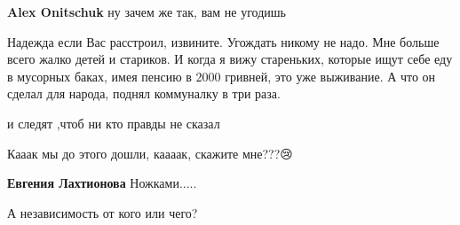\begin{itemize}
\begin{itemize}
\textbf{Alex Onitschuk} ну зачем же так, вам не угодишь

 

Надежда если Вас расстроил, извините. Угождать никому не надо. Мне больше всего
жалко детей и стариков. И когда я вижу стареньких, которые ищут себе еду в
мусорных баках, имея пенсию в 2000 гривней, это уже выживание. А что он сделал
для народа, поднял коммуналку в три раза.

\end{itemize}

 
и следят ,чтоб ни кто правды не сказал

 
Кааак мы до этого дошли, каааак, скажите мне???😢

\begin{itemize}
 
\textbf{Евгения Лахтионова} Ножками.....
\end{itemize}

 
А независимость от кого или чего?

 

\end{itemize}
